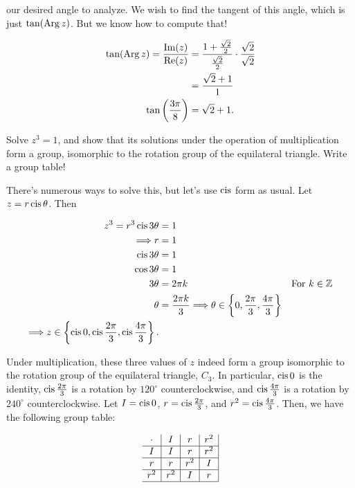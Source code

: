 \documentclass[../key.tex]{subfiles}
\begin{document}
our desired angle to analyze. We wish to find the tangent of this angle, which is just $\tan(\operatorname{Arg} z)$. But we know how to compute that!

\begin{align*}
\tan(\operatorname{Arg} z) = \frac{\operatorname{Im}(z)}{\operatorname{Re}(z)} &= \frac{1 + \frac{\sqrt{2}}{2}}{\frac{\sqrt{2}}{2}} \cdot \frac{\sqrt{2}}{\sqrt{2}} \\
&= \frac{\sqrt{2} + 1}{1} \\
\tan \left( \frac{3\pi}{8} \right) &= \sqrt{2} + 1.
\end{align*}

\begin{outer_problem}
\item Solve $z^3 = 1$, and show that its solutions under the operation of multiplication form a group, isomorphic to the rotation group of the equilateral triangle. Write a group table!
\end{outer_problem}

There's numerous ways to solve this, but let's use $\operatorname{cis}$ form as usual. Let $z=r\operatorname{cis}\theta$. Then

\begin{align*}
z^3 = r^3\operatorname{cis} 3\theta &= 1 \\
\Longrightarrow r &= 1 \\
\operatorname{cis} 3\theta &= 1 \\
\cos 3\theta &= 1 \\
3\theta &= 2\pi k & \text{For } k\in\mathbb{Z} \\
\theta &= \frac{2\pi k}{3}
\Longrightarrow \theta \in \left\{0,\frac{2\pi}{3},\frac{4\pi}{3}\right\} \\
\Longrightarrow z \in \left\{\operatorname{cis} 0,\operatorname{cis} \frac{2\pi}{3},\operatorname{cis} \frac{4\pi}{3}\right\}.
\end{align*}

Under multiplication, these three values of $z$ indeed form a group isomorphic to the rotation group of the equilateral triangle, $C_3$. In particular, $\operatorname{cis} 0$ is the identity, $\operatorname{cis} \frac{2\pi}{3}$ is a rotation by $120^\circ$ counterclockwise, and $\operatorname{cis} \frac{4\pi}{3}$ is a rotation by $240^\circ$ counterclockwise. Let $I=\operatorname{cis} 0$, $r=\operatorname{cis}\frac{2\pi}{3}$, and $r^2=\operatorname{cis} \frac{4\pi}{3}$. Then, we have the following group table:

$$\begin{array}{c|c|c|c|}
\cdot & I & r & r^2 \\ \hline
I & I & r & r^2 \\ \hline
r & r & r^2 & I \\ \hline
r^2 & r^2 & I & r \\ \hline
\end{array}$$
\end{document}
